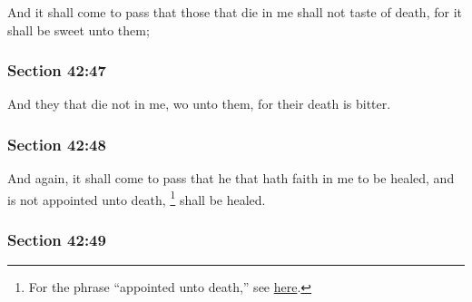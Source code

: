 		And it shall come to pass that those that die in me shall not taste of death, for it shall be sweet unto them;


	\subsubsection{Section 42:47} %
		\label{DC42-47}

		And they that die not in me, wo unto them, for their death is bitter.


	\subsubsection{Section 42:48} %
		\label{DC42-48}

		And again, it shall come to pass that he that hath faith in me to be healed, and is not appointed unto death,%
			\footnote{%
				For the phrase ``appointed unto death,'' see \hyperref[DEATH-PHRASES]{here}.
				} 
		shall be healed.


	\subsubsection{Section 42:49} %
		\label{DC42-49}

